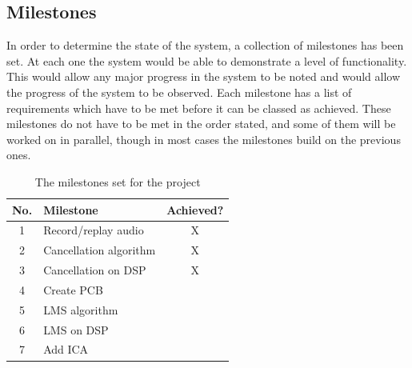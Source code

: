 \subsection{Milestones}
In order to determine the state of the system, a collection of milestones has been set.
At each one the system would be able to demonstrate a level of functionality.
This would allow any major progress in the system to be noted and would allow the progress of the system to be observed.
Each milestone has a list of requirements which have to be met before it can be classed as achieved.
These milestones do not have to be met in the order stated, and some of them will be worked on in parallel, though in most cases the milestones build on the previous ones.

\begin{table}[H]
	\centering
	\begin{tabular}[c]{| c | l | c |}
		\hline
		No.	& Milestone		& Achieved? \\
		\hline
		1	& Record/replay audio	& X \\
		2	& Cancellation algorithm & X \\
		3	& Cancellation on DSP	& X \\
		4	& Create PCB		& \\
		5	& LMS algorithm		& \\
		6	& LMS on DSP		& \\
		7	& Add ICA		& \\
		\hline
	\end{tabular}
	\caption{The milestones set for the project}
	\label{tab:milestones}
\end{table}
